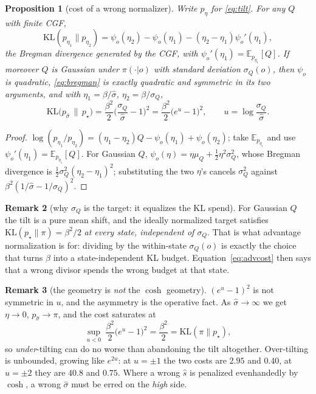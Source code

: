 \documentclass[11pt]{article}
\newtheorem{proposition}{Proposition}
\theoremstyle{definition}
\newtheorem{remark}[proposition]{Remark}
\newcommand{\E}{\mathbb{E}}
\begin{document}
\begin{proposition}[cost of a wrong normalizer]
\label{prop:advkl}
Write $p_\eta$ for \eqref{eq:tilt}. For any $Q$ with finite CGF,
\begin{equation}
  \mathrm{KL}(p_{\eta_1}\|p_{\eta_2})
  =\psi_o(\eta_2)-\psi_o(\eta_1)-(\eta_2-\eta_1)\psi_o'(\eta_1),
  \label{eq:bregman}
\end{equation}
the Bregman divergence generated by the CGF, with $\psi_o'(\eta_1)=\E_{p_{\eta_1}}[Q]$.
If moreover $Q$ is Gaussian under $\pi(\cdot|o)$ with standard deviation
$\sigma_Q(o)$, then $\psi_o$ is quadratic, \eqref{eq:bregman} is exactly
quadratic and symmetric in its two arguments, and with $\eta_1=\beta/\hat\sigma$,
$\eta_2=\beta/\sigma_Q$,
\begin{equation}
  \boxed{\;
  \mathrm{KL}\big(p_{\hat\sigma}\,\|\,p_\star\big)
  =\frac{\beta^2}{2}\Big(\frac{\sigma_Q}{\hat\sigma}-1\Big)^{2}
  =\frac{\beta^2}{2}\big(e^{u}-1\big)^{2},\qquad
  u=\log\frac{\sigma_Q}{\hat\sigma}.
  \;}
  \label{eq:advcost}
\end{equation}
\end{proposition}

\begin{proof}
$\log(p_{\eta_1}/p_{\eta_2})=(\eta_1-\eta_2)Q-\psi_o(\eta_1)+\psi_o(\eta_2)$;
take $\E_{p_{\eta_1}}$ and use $\psi_o'(\eta_1)=\E_{p_{\eta_1}}[Q]$. For Gaussian
$Q$, $\psi_o(\eta)=\eta\mu_Q+\tfrac12\eta^2\sigma_Q^2$, whose Bregman divergence
is $\tfrac12\sigma_Q^2(\eta_2-\eta_1)^2$; substituting the two $\eta$'s cancels
$\sigma_Q^2$ against $\beta^2(1/\hat\sigma-1/\sigma_Q)^2$.
\end{proof}

\begin{remark}[why $\sigma_Q$ is the target: it equalizes the KL spend]
For Gaussian $Q$ the tilt is a pure mean shift, and the ideally normalized
target satisfies $\mathrm{KL}(p_\star\|\pi)=\beta^2/2$ \emph{at every state,
independent of $\sigma_Q$}. That is what advantage normalization is for:
dividing by the within-state $\sigma_Q(o)$ is exactly the choice that turns
$\beta$ into a state-independent KL budget. Equation~\eqref{eq:advcost} then says
that a wrong divisor spends the wrong budget at that state.
\end{remark}

\begin{remark}[the geometry is \emph{not} the $\cosh$ geometry]
\label{rem:advasym}
$(e^u-1)^2$ is not symmetric in $u$, and the asymmetry is the operative fact. As
$\hat\sigma\to\infty$ we get $\eta\to0$, $p_{\hat\sigma}\to\pi$, and the cost
saturates at
\begin{equation}
  \sup_{u<0}\ \frac{\beta^2}{2}\big(e^u-1\big)^2=\frac{\beta^2}{2}
  =\mathrm{KL}(\pi\|p_\star),
\end{equation}
so \emph{under}-tilting can do no worse than abandoning the tilt altogether.
Over-tilting is unbounded, growing like $e^{2u}$: at $u=\pm1$ the two costs are
$2.95$ and $0.40$, at $u=\pm2$ they are $40.8$ and $0.75$. Where a wrong $\hat s$
is penalized evenhandedly by $\cosh$, a wrong $\hat\sigma$ must be erred on the
\emph{high} side.
\end{remark}
\end{document}
